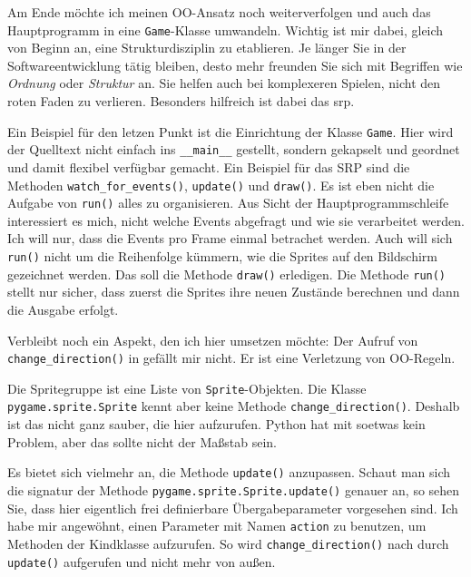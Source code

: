 Am Ende möchte ich meinen OO-Ansatz noch weiterverfolgen und auch das Hauptprogramm in eine \texttt{Game}-Klasse umwandeln. Wichtig ist mir dabei, gleich von Beginn an, eine Strukturdisziplin zu etablieren. Je länger Sie in der Softwareentwicklung tätig bleiben, desto mehr freunden Sie sich mit Begriffen wie \emph{Ordnung} oder \emph{Struktur} an. Sie helfen auch bei komplexeren Spielen, nicht den roten Faden zu verlieren. Besonders hilfreich ist dabei das \Gls{srp}.

\newpage
{}

Ein Beispiel für den letzen Punkt ist die Einrichtung der Klasse \texttt{Game}. Hier wird der Quelltext nicht einfach ins \texttt{\_\_main\_\_} gestellt, sondern gekapselt und geordnet und damit flexibel verfügbar gemacht. Ein Beispiel für das SRP sind die Methoden \texttt{watch\_for\_e\-vents()}, \texttt{update()} und \texttt{draw()}. Es ist eben nicht die Aufgabe von \texttt{run()} alles zu organisieren. Aus Sicht der Hauptprogrammschleife interessiert es mich, nicht welche Events abgefragt und wie sie verarbeitet werden. Ich will nur, dass die Events pro Frame einmal betrachet werden. Auch will sich \texttt{run()} nicht um die Reihenfolge kümmern, wie die Sprites auf den Bildschirm gezeichnet werden. Das soll die Methode \texttt{draw()} erledigen. Die Methode \texttt{run()} stellt nur sicher, dass zuerst die Sprites ihre neuen Zustände berechnen und dann die Ausgabe erfolgt.


Verbleibt noch ein Aspekt, den ich hier umsetzen möchte: Der Aufruf von \texttt{change\_di\-rec\-tion()} in  gefällt mir nicht. Er ist eine Verletzung von OO-Regeln. 

Die Spritegruppe ist eine Liste von \texttt{Sprite}-Objekten. Die Klasse \texttt{pygame.sprite.Sprite} kennt aber keine Methode \texttt{change\_direction()}. Deshalb ist das nicht ganz sauber, die hier aufzurufen. Python hat mit soetwas kein Problem, aber das sollte nicht der Maßstab sein. 

Es bietet sich vielmehr an, die Methode \texttt{update()} anzupassen. Schaut man sich die \gls{signatur} der Methode \texttt{pygame.sprite.Sprite.update()} genauer an, so sehen Sie, dass hier eigentlich frei definierbare Übergabeparameter vorgesehen sind.  Ich habe mir angewöhnt, einen Parameter mit Namen \texttt{action} zu benutzen, um Methoden der Kindklasse aufzurufen. So wird \texttt{change\_direction()} nach  durch \texttt{update()} aufgerufen und nicht mehr von außen.

